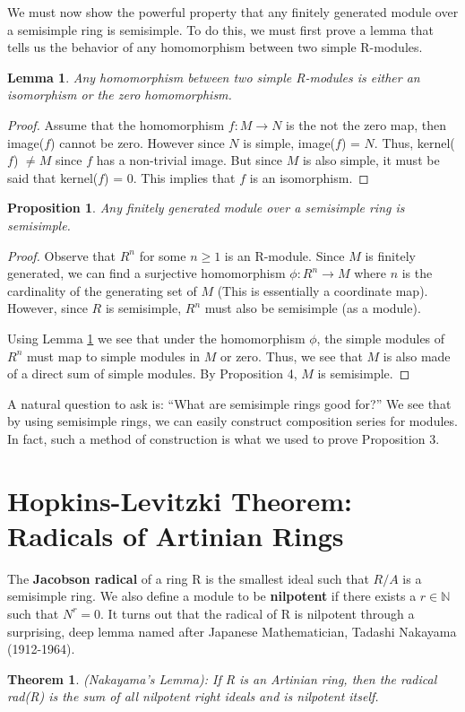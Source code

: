 \documentclass[11pt]{article}
\newtheorem{theorem}{Theorem}[section]
\newtheorem{proposition}{Proposition}
\newtheorem{lemma}{Lemma}[section]
\begin{document}
We must now show the powerful property that any finitely generated module over a semisimple ring is semisimple. To do this, we must first prove a lemma that tells us the behavior of any homomorphism between two simple R-modules.

\noindent
\begin{lemma} \label{lemmahomo} Any homomorphism between two simple R-modules is either an isomorphism or the zero homomorphism. \end{lemma}

\noindent
\begin{proof} Assume that the homomorphism $f: M \rightarrow N$ is the not the zero map, then image($f$) cannot be zero. However since $N$ is simple, image($f$) = $N$. Thus, kernel($f$) $\neq M$ since $f$ has a non-trivial image. But since $M$ is also simple, it must be said that kernel($f$) = 0. This implies that $f$ is an isomorphism. \end{proof}

\noindent
\begin{proposition} Any finitely generated module over a semisimple ring is semisimple. \end{proposition}

\noindent
\begin{proof} Observe that $R^n$ for some $n \geq 1$ is an R-module. Since $M$ is finitely generated, we can find a surjective homomorphism $\phi: R^n \rightarrow M$ where $n$ is the cardinality of the generating set of $M$ (This is essentially a coordinate map). However, since $R$ is semisimple, $R^n$ must also be semisimple (as a module).

Using Lemma \ref{lemmahomo} we see that under the homomorphism $\phi$, the simple modules of $R^n$ must map to simple modules in $M$ or zero. Thus, we see that $M$ is also made of a direct sum of simple modules. By Proposition 4, $M$ is semisimple. \end{proof}

A natural question to ask is: ``What are semisimple rings good for?'' We see that by using semisimple rings, we can easily construct composition series for modules. In fact, such a method of construction is what we used to prove Proposition 3. 

\section{Hopkins-Levitzki Theorem: Radicals of Artinian Rings}

The \textbf{Jacobson radical} of a ring R is the smallest ideal such that $R/A$ is a semisimple ring. We also define a module to be \textbf{nilpotent} if there exists a $r \in \mathbb{N}$ such that $N^r = 0$. It turns out that the radical of R is nilpotent through a surprising, deep lemma named after Japanese Mathematician, Tadashi Nakayama (1912-1964).
\noindent
\begin{theorem}(Nakayama's Lemma): If R is an Artinian ring, then the radical rad(R) is the sum of all nilpotent right ideals and is nilpotent itself. \end{theorem}
\end{document}
